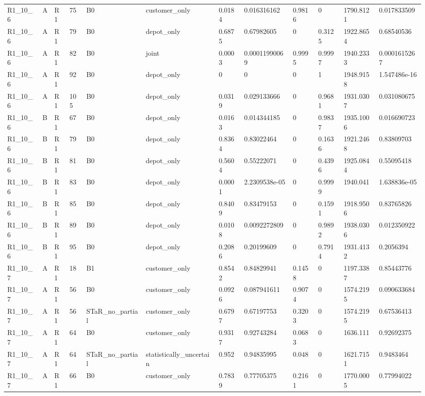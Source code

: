 \begin{longtable}{llllllllllll}
R1\_10\_6 & A & R1 & 75 & B0 & customer\_only & 0.0184 & 0.016316162 & 0.9816 & 0 & 1790.8121 & 0.017833509 \\
R1\_10\_6 & A & R1 & 79 & B0 & depot\_only & 0.6875 & 0.67982605 & 0 & 0.3125 & 1922.8654 & 0.68540536 \\
R1\_10\_6 & A & R1 & 82 & B0 & joint & 0.0003 & 0.00011990069 & 0.9995 & 0.9997 & 1940.2333 & 0.0001615267 \\
R1\_10\_6 & A & R1 & 92 & B0 & depot\_only & 0 & 0 & 0 & 1 & 1948.9158 & 1.547486e-16 \\
R1\_10\_6 & A & R1 & 105 & B0 & depot\_only & 0.0319 & 0.029133666 & 0 & 0.9681 & 1931.0307 & 0.031080675 \\
R1\_10\_6 & B & R1 & 67 & B0 & depot\_only & 0.0163 & 0.014344185 & 0 & 0.9837 & 1935.1006 & 0.016690723 \\
R1\_10\_6 & B & R1 & 79 & B0 & depot\_only & 0.8364 & 0.83022464 & 0 & 0.1636 & 1921.2468 & 0.83809703 \\
R1\_10\_6 & B & R1 & 81 & B0 & depot\_only & 0.5604 & 0.55222071 & 0 & 0.4396 & 1925.0844 & 0.55095418 \\
R1\_10\_6 & B & R1 & 83 & B0 & depot\_only & 0.0001 & 2.2309538e-05 & 0 & 0.9999 & 1940.041 & 1.638836e-05 \\
R1\_10\_6 & B & R1 & 85 & B0 & depot\_only & 0.8409 & 0.83479153 & 0 & 0.1591 & 1918.9506 & 0.83765826 \\
R1\_10\_6 & B & R1 & 89 & B0 & depot\_only & 0.0108 & 0.0092272809 & 0 & 0.9892 & 1938.0306 & 0.012350922 \\
R1\_10\_6 & B & R1 & 95 & B0 & depot\_only & 0.2086 & 0.20199609 & 0 & 0.7914 & 1931.4132 & 0.2056394 \\
R1\_10\_7 & A & R1 & 18 & B1 & customer\_only & 0.8542 & 0.84829941 & 0.1458 & 0 & 1197.3387 & 0.85443776 \\
R1\_10\_7 & A & R1 & 56 & B0 & customer\_only & 0.0926 & 0.087941611 & 0.9074 & 0 & 1574.2195 & 0.090633684 \\
R1\_10\_7 & A & R1 & 56 & STaR\_no\_partial & customer\_only & 0.6797 & 0.67197753 & 0.3203 & 0 & 1574.2195 & 0.67536413 \\
R1\_10\_7 & A & R1 & 64 & B0 & customer\_only & 0.9317 & 0.92743284 & 0.0683 & 0 & 1636.111 & 0.92692375 \\
R1\_10\_7 & A & R1 & 64 & STaR\_no\_partial & statistically\_uncertain & 0.952 & 0.94835995 & 0.048 & 0 & 1621.7151 & 0.9483464 \\
R1\_10\_7 & A & R1 & 66 & B0 & customer\_only & 0.7839 & 0.77705375 & 0.2161 & 0 & 1770.0005 & 0.77994022 \\

\end{longtable}
